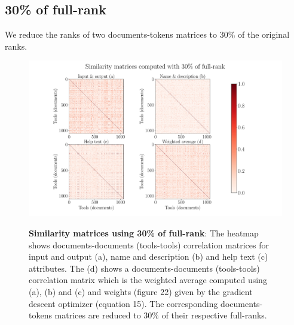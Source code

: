 \subsection{30\% of full-rank}
We reduce the ranks of two documents-tokens matrices to 30\% of the original ranks.

\begin{figure}[h]
\begin{centering}
    {\includegraphics[scale=0.35]{figures/Similarity_matrices_030.pdf}}
    \caption[Similarity matrices 30\% rank]{\textbf{Similarity matrices using 30\% of full-rank}: The heatmap shows documents-documents (tools-tools) correlation matrices for input and output (a), name and description (b) and help text (c) attributes. The (d) shows a documents-documents (tools-tools) correlation matrix which is the weighted average computed using (a), (b) and (c) and weights (figure 22) given by the gradient descent optimizer (equation 15). The corresponding documents-tokens matrices are reduced to 30\% of their respective full-ranks.}
\end{centering}
\end{figure}

